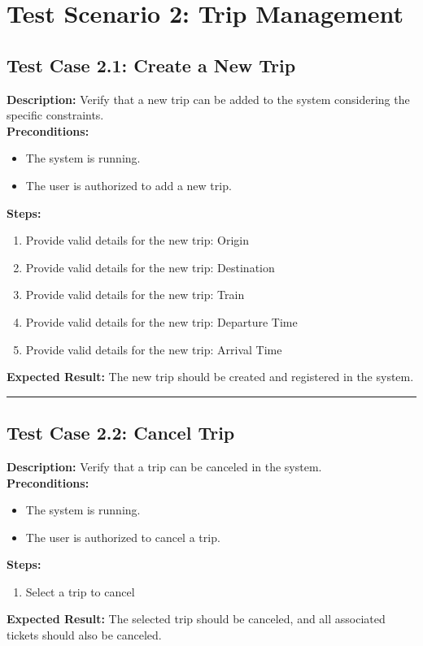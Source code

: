 \documentclass{article}
\begin{document}
\pagebreak

\section{Test Scenario 2: Trip Management}
\bigskip
\bigskip
\subsection{Test Case 2.1: Create a New Trip}

\textbf{Description:} Verify that a new trip can be added to the system considering the specific constraints.\\
\textbf{Preconditions:}
\begin{itemize}
  \item The system is running.
  \item The user is authorized to add a new trip.
\end{itemize}
\textbf{Steps:}
\begin{enumerate}
  \item Provide valid details for the new trip: Origin
  \item Provide valid details for the new trip: Destination
  \item Provide valid details for the new trip: Train
  \item Provide valid details for the new trip: Departure Time
  \item Provide valid details for the new trip: Arrival Time
\end{enumerate}
\textbf{Expected Result:} The new trip should be created and registered in the system.

\bigskip
\hrule
\bigskip

\subsection{Test Case 2.2: Cancel Trip}

\textbf{Description:} Verify that a trip can be canceled in the system.\\
\textbf{Preconditions:}
\begin{itemize}
  \item The system is running.
  \item The user is authorized to cancel a trip.
\end{itemize}
\textbf{Steps:}
\begin{enumerate}
  \item Select a trip to cancel 
\end{enumerate}
\textbf{Expected Result:} The selected trip should be canceled, and all associated tickets should also be canceled.
\end{document}
